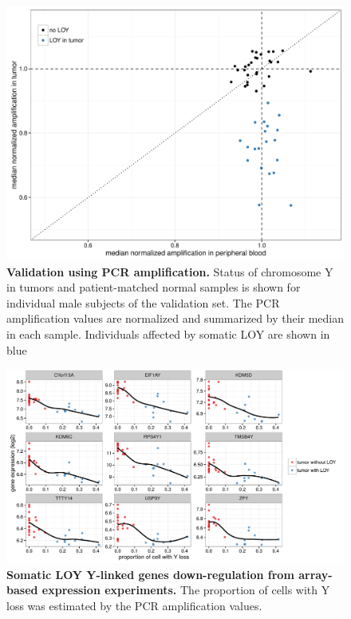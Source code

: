 \begin{figure}[ht]
  \centering
  \includegraphics[width=.9\linewidth]{figures/Cagekid-LOY-PCR-fig.pdf}
  \caption[Validation using PCR amplification.]{{\bf Validation using PCR amplification.} {\small Status of chromosome Y in tumors and patient-matched normal samples is shown for individual male subjects of the validation set. The PCR amplification values are normalized and summarized by their median in each sample. Individuals affected by somatic LOY are shown in blue}}
  \label{fig:loyS2}
\end{figure}

\begin{figure}[ht]
  \centering
  \includegraphics[width=.9\linewidth]{figures/Cagekid-LOY-fig3-array.png}
  \caption[Somatic LOY Y-linked genes down-regulation from array-based expression experiments.]{{\bf Somatic LOY Y-linked genes down-regulation from array-based expression experiments.} {\small The proportion of cells with Y loss was estimated by the PCR amplification values.}}
  \label{fig:loyS3}
\end{figure}


